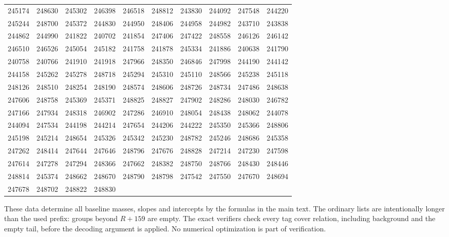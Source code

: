 {\begin{longtable}{rrrrrrrrrr}
245174 & 248630 & 245302 & 246398 & 246518 & 248812 & 243830 & 244092 & 247548 & 244220\\
245244 & 248700 & 245372 & 244830 & 244950 & 248406 & 244958 & 244982 & 243710 & 243838\\
244862 & 244990 & 241822 & 240702 & 241854 & 247406 & 247422 & 248558 & 246126 & 246142\\
246510 & 246526 & 245054 & 245182 & 241758 & 241878 & 245334 & 241886 & 240638 & 241790\\
240758 & 240766 & 241910 & 241918 & 247966 & 248350 & 246846 & 247998 & 244190 & 244142\\
244158 & 245262 & 245278 & 248718 & 245294 & 245310 & 245110 & 248566 & 245238 & 245118\\
248126 & 248510 & 248254 & 248190 & 248574 & 248606 & 248726 & 248734 & 247486 & 248638\\
247606 & 248758 & 245369 & 245371 & 248825 & 248827 & 247902 & 248286 & 248030 & 246782\\
247166 & 247934 & 248318 & 246902 & 247286 & 246910 & 248054 & 248438 & 248062 & 244078\\
244094 & 247534 & 244198 & 244214 & 247654 & 244206 & 244222 & 245350 & 245366 & 248806\\
245198 & 245214 & 248654 & 245326 & 245342 & 245230 & 248782 & 245246 & 248686 & 245358\\
247262 & 248414 & 247644 & 247646 & 248796 & 247676 & 248828 & 247214 & 247230 & 247598\\
247614 & 247278 & 247294 & 248366 & 247662 & 248382 & 248750 & 248766 & 248430 & 248446\\
248814 & 245374 & 248662 & 248670 & 248790 & 248798 & 247542 & 247550 & 247670 & 248694\\
247678 & 248702 & 248822 & 248830 & & & & & &\\
\end{longtable}}

These data determine all baseline masses, slopes and intercepts by the
formulas in the main text. The ordinary lists are intentionally longer than
the used prefix: groups beyond $R+159$ are empty. The exact verifiers check
every tag cover relation, including background and the empty tail, before
the decoding argument is applied. No numerical optimization is part of
verification.
